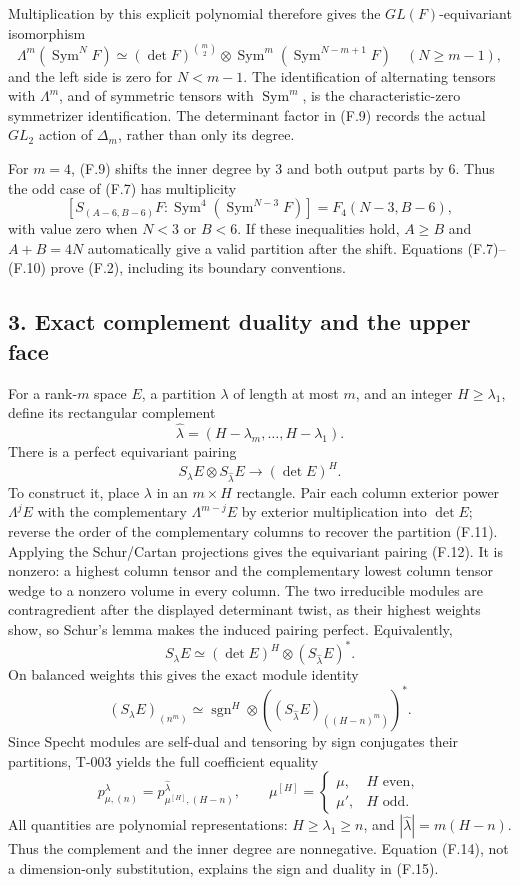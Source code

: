 \documentclass[
  10pt,
]{article}
\begin{document}
Multiplication by this explicit polynomial therefore gives the
\(GL(F)\)-equivariant isomorphism \[
\boxed{
\Lambda^m(\operatorname{Sym}^N F)
\simeq(\det F)^{\binom m2}\otimes
\operatorname{Sym}^m(\operatorname{Sym}^{N-m+1}F)
\quad(N\ge m-1),}
\tag{F.9}
\] and the left side is zero for \(N<m-1\). The identification of
alternating tensors with \(\Lambda^m\), and of symmetric tensors with
\(\operatorname{Sym}^m\), is the characteristic-zero symmetrizer
identification. The determinant factor in (F.9) records the actual
\(GL_2\) action of \(\Delta_m\), rather than only its degree.

For \(m=4\), (F.9) shifts the inner degree by 3 and both output parts by
6. Thus the odd case of (F.7) has multiplicity \[
[S_{(A-6,B-6)}F:\operatorname{Sym}^4(\operatorname{Sym}^{N-3}F)]
=F_4(N-3,B-6),
\tag{F.10}
\] with value zero when \(N<3\) or \(B<6\). If these inequalities hold,
\(A\ge B\) and \(A+B=4N\) automatically give a valid partition after the
shift. Equations (F.7)--(F.10) prove (F.2), including its boundary
conventions.

\subsection{3. Exact complement duality and the upper
face}\label{exact-complement-duality-and-the-upper-face}

For a rank-\(m\) space \(E\), a partition \(\lambda\) of length at most
\(m\), and an integer \(H\ge\lambda_1\), define its rectangular
complement \[
\widehat\lambda=(H-\lambda_m,\ldots,H-\lambda_1).
\tag{F.11}
\] There is a perfect equivariant pairing \[
S_\lambda E\otimes S_{\widehat\lambda}E\longrightarrow(\det E)^H.
\tag{F.12}
\] To construct it, place \(\lambda\) in an \(m\times H\) rectangle.
Pair each column exterior power \(\Lambda^j E\) with the complementary
\(\Lambda^{m-j}E\) by exterior multiplication into \(\det E\); reverse
the order of the complementary columns to recover the partition (F.11).
Applying the Schur/Cartan projections gives the equivariant pairing
(F.12). It is nonzero: a highest column tensor and the complementary
lowest column tensor wedge to a nonzero volume in every column. The two
irreducible modules are contragredient after the displayed determinant
twist, as their highest weights show, so Schur's lemma makes the induced
pairing perfect. Equivalently, \[
S_\lambda E\simeq(\det E)^H\otimes(S_{\widehat\lambda}E)^*.
\tag{F.13}
\] On balanced weights this gives the exact module identity \[
(S_\lambda E)_{(n^m)}
\simeq\operatorname{sgn}^{H}\otimes
\left((S_{\widehat\lambda}E)_{((H-n)^m)}\right)^*.
\tag{F.14}
\] Since Specht modules are self-dual and tensoring by sign conjugates
their partitions, T-003 yields the full coefficient equality \[
p_{\mu,(n)}^\lambda
=p_{\mu^{[H]},(H-n)}^{\widehat\lambda},
\qquad
\mu^{[H]}=\begin{cases}\mu,&H\text{ even},\\\mu',&H\text{ odd}.\end{cases}
\tag{F.15}
\] All quantities are polynomial representations:
\(H\ge\lambda_1\ge n\), and \(|\widehat\lambda|=m(H-n)\). Thus the
complement and the inner degree are nonnegative. Equation (F.14), not a
dimension-only substitution, explains the sign and duality in (F.15).
\end{document}
